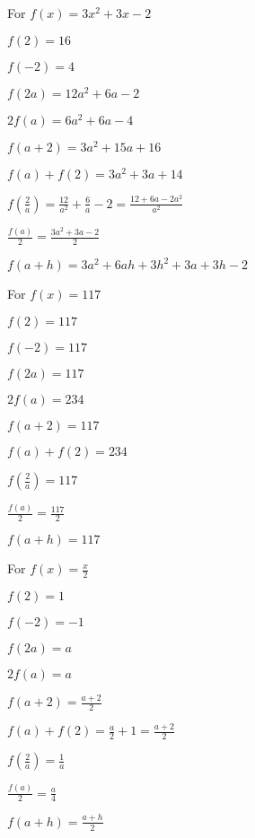 \begin{exenum}
\item For $f(x) = 3x^2+3x-2$

\begin{shortitemize}
\item  $f(2) = 16$
\item  $f(-2) = 4$
\item  $f(2a) = 12a^2+6a-2$
\item  $2 f(a) = 6a^2+6a-4$
\item $f(a+2) = 3a^2+15a+16$
\item \small $f(a) + f(2) = 3a^2+3a+14$ \normalsize
\item  $f \left( \frac{2}{a} \right) = \frac{12}{a^2} + \frac{6}{a} - 2 = \frac{12+6a-2a^2}{a^2}$
\item $\frac{f(a)}{2} =  \frac{3a^2+3a-2}{2}$
\item  $f(a + h) = 3a^2 + 6ah + 3h^2+3a+3h-2$
\end{shortitemize}

\item For $f(x) = 117$

\begin{shortitemize}
\item  $f(2) = 117$
\item  $f(-2) = 117$
\item  $f(2a) = 117$
\item  $2 f(a) = 234$
\item $f(a+2) = 117$
\item $f(a) + f(2) = 234$
\item  $f \left( \frac{2}{a} \right) = 117$ 
\item $\frac{f(a)}{2} = \frac{117}{2}$
\item  $f(a + h) = 117$
\end{shortitemize}

\item For $f(x) = \frac{x}{2}$

\begin{shortitemize}
\item  $f(2) = 1$
\item  $f(-2) = -1$
\item  $f(2a) = a$
\item  $2 f(a) = a$
\item $f(a+2) = \frac{a+2}{2}$
\item $f(a) + f(2) = \frac{a}{2}+ 1 = \frac{a+2}{2}$
\item  $f \left( \frac{2}{a} \right) = \frac{1}{a}$
\item $\frac{f(a)}{2} =  \frac{a}{4}$
\item  $f(a + h) = \frac{a+h}{2}$
\end{shortitemize}


\end{exenum}
